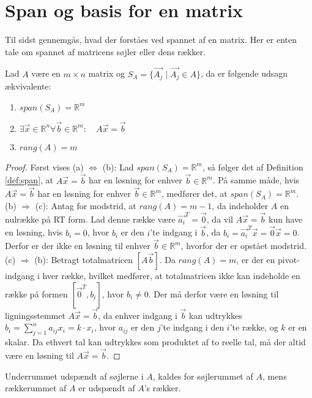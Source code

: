 \section{Span og basis for en matrix}
Til sidst gennemgås, hvad der forståes ved spannet af en matrix.
Her er enten tale om spannet af matricens søjler eller dens rækker.
\begin{stn}
Lad $A$ være en $m\times n$ matrix og $S_A= \{\vec{A_j}\mid \vec{ A_j}\in A\}$, da er følgende udsagn ækvivalente:
\begin{enumerate}[label=\alph*]
\item $span(S_A) = \mathds{R}^m$
\item $\exists \vec{x} \in \mathds{R}^n \forall \vec{b} \in \mathds{R}^m: \quad A\vec{x}=\vec{b}$
\item $rang(A) = m$
\end{enumerate}
\end{stn}
\begin{proof}
Først vises (a) $\Leftrightarrow$ (b):
Lad $span(S_A) = \mathds{R}^m$, så følger det af Definition \ref{def:span}, at $A\vec{x}= \vec{b}$ har en løsning for enhver $\vec{b} \in \mathds{R}^m$.
På samme måde, hvis $A\vec{x}= \vec{b}$ har en løsning for enhver $\vec{b} \in \mathds{R}^m$, medfører det, at $span(S_A) = \mathds{R}^m$. 
\\(b) $\Rightarrow$ (c):
Antag for modstrid, at $rang(A) = m-1$, da indeholder $A$ en nulrække på RT form. 
Lad denne række være $\vec{a_i}^T = \vec{0}$, da vil $A\vec{x} = \vec{b}$ kun have en løsning, hvis $b_i=0$, hvor $b_i$ er den $i$'te indgang i $\vec{b}$, da $b_i = \vec{a_i}^T \vec{x} = \vec{0} \vec{x} = 0$. 
Derfor er der ikke en løsning til enhver $\vec{b} \in \mathds{R}^m$, hvorfor der er opstået modstrid.
\\(c) $\Rightarrow$ (b): 
Betragt totalmatricen $[A \vec{b}]$. 
Da $rang(A) = m$, er der en pivot-indgang i hver række,
hvilket medfører, at totalmatricen ikke kan indeholde en række på formen $[\vec{0}^T, b_i]$, hvor $b_i \neq 0$.
Der må derfor være en løsning til ligningsstemmet $A\vec{x} = \vec{b}$, da enhver indgang i $\vec{b}$ kan udtrykkes $b_i = \sum_{j=1}^n a_{ij} x_i = k \cdot x_i$, hvor $a_{ij}$ er den $j$'te indgang i den $i$'te række, og $k$ er en skalar.
Da ethvert tal kan udtrykkes som produktet af to reelle tal, må der altid være en løsning til $A\vec{x}=\vec{b}$.
\end{proof}
Underrummet udspændt af søjlerne i $A$, kaldes for søjlerummet af $A$, mens rækkerummet af $A$ er udspændt af $A$'s rækker.
